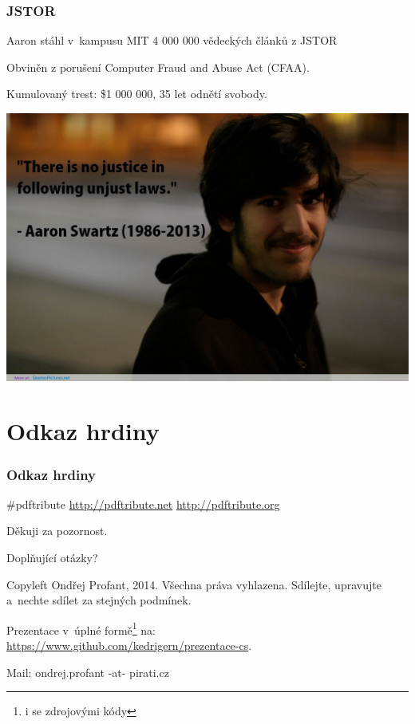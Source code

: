 \documentclass[xetex]{beamer}
\begin{document}
\begin{frame}
	\frametitle{JSTOR}
	Aaron stáhl v~kampusu MIT 4 000 000 vědeckých článků z JSTOR

	\bigskip

	Obviněn z porušení Computer Fraud and Abuse Act (CFAA).

	Kumulovaný trest: \$1 000 000, 35 let odnětí svobody.
\end{frame}

\begin{frame}
	\includegraphics[scale=0.15]{images/no-justice.jpg}
\end{frame}

\section{Odkaz hrdiny}
\begin{frame}
	\frametitle{Odkaz hrdiny}
	\#pdftribute \url{http://pdftribute.net} \url{http://pdftribute.org}
\end{frame}


\begin{frame}

	Děkuji za pozornost.

	\bigskip
	
	Doplňující otázky?

	\bigskip

	\bigskip

	\scriptsize
	Copyleft Ondřej Profant, 2014. 
	Všechna práva vyhlazena. Sdílejte, upravujte a~nechte sdílet za stejných podmínek. 

	\bigskip

	Prezentace v~úplné formě\footnote{i se zdrojovými kódy} na:\\ 
	\url{https://www.github.com/kedrigern/prezentace-cs}.

	\bigskip

	Mail: ondrej.profant -at- pirati.cz 
\end{frame}
\end{document}
